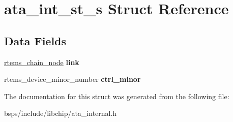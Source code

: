\hypertarget{structata__int__st__s}{}\section{ata\+\_\+int\+\_\+st\+\_\+s Struct Reference}
\label{structata__int__st__s}
\subsection*{Data Fields}
\begin{DoxyCompactItemize}
\item 
\mbox{\label{structata__int__st__s_a053e9d92600a1316d7a68ec73ab399cc}} 
\mbox{\hyperlink{structChain__Node__struct}{rtems\+\_\+chain\+\_\+node}} {\bfseries link}
\item 
\mbox{\label{structata__int__st__s_a2e7386ac3d37a313c93a2cf08465d7fb}} 
rtems\+\_\+device\+\_\+minor\+\_\+number {\bfseries ctrl\+\_\+minor}
\end{DoxyCompactItemize}


The documentation for this struct was generated from the following file\+:\begin{DoxyCompactItemize}
\item 
bsps/include/libchip/ata\+\_\+internal.\+h\end{DoxyCompactItemize}
